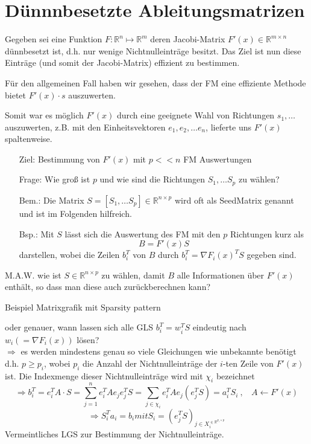 \section{Dünnnbesetzte Ableitungsmatrizen}
\label{chap:sparsemats}

Gegeben sei eine Funktion $F:\mathbb{R}^n\mapsto\mathbb{R}^m$ deren Jacobi-Matrix $F'(x) \in \mathbb{R}^{m\times n}$ dünnbesetzt ist, d.h. nur wenige Nichtnulleinträge besitzt. Das Ziel ist nun diese Einträge (und somit der Jacobi-Matrix) effizient zu bestimmen.

\noindent
Für den allgemeinen Fall haben wir gesehen, dass der FM eine effiziente Methode bietet $F'(x)\cdot s$ auszuwerten.

Somit war es möglich $F'(x)$ durch eine geeignete Wahl von Richtungen  $s_1,\dots$ auszuwerten, z.B. mit den Einheitsvektoren $e_1,e_2, \dots e_n$, lieferte uns $F'(x)$ spaltenweise.\\


\begin{itemize}
	\item[Ziel:] Bestimmung von $F'(x)$ mit $p <<n$ FM Auswertungen
	\item[Frage:]Wie groß ist $p$ und wie sind die Richtungen $S_1,\dots S_p$ zu wählen?
	\item[Bem.:] Die Matrix $S = [S_1, \dots S_p] \in \mathbb{R}^{n\times p}$ wird oft als \glqq Seed\grqq Matrix genannt und ist im Folgenden hilfreich.
	\item[Bsp.:]
	Mit $S$ lässt sich die Auswertung des FM mit den $p$ Richtungen kurz als 
	$$B = F'(x)S$$
	darstellen, wobei die Zeilen $b_i^T$ von $B$ durch $b_i^T = \nabla F_i(x)^TS$ gegeben sind.
\end{itemize}

\noindent
M.A.W. wie ist $S\in\mathbb{R}^{n\times p}$ zu wählen, damit $B$ alle Informationen über $F'(x)$ enthält, so dass man diese auch zurückberechnen kann?

Beispiel Matrixgrafik mit Sparsity pattern\\
\vspace{3cm}

oder genauer, wann lassen sich alle GLS $b_i^T = w_i^TS$ eindeutig nach $w_i (=\nabla F_i(x))$ lösen?\\
$\Rightarrow$ es werden mindestens genau so viele Gleichungen wie unbekannte benötigt\\

\noindent
d.h. $p \geq p_i$, wobei $p_i$ die Anzahl der Nichtnulleinträge der $i$-ten Zeile von $F'(x)$ ist. Die Indexmenge dieser Nichtnulleinträge wird mit $\chi_i$ bezeichnet
$$\Rightarrow b_i^T = e_i^T A \cdot S = \sum_{j=1}^n e_i^T A e_j e_j^T S =\sum_{j\in \chi_i} e_i^T A e_j (e_j^T S) = a_i^T S_i \ ,\ \ \ \ A \leftarrow F'(x)$$
$$\Rightarrow S_i^Ta_i = b_i mit S_i = (e_j^TS)_{j\in X_i^{\in \mathbb{R}^{p_i\times p}}}$$
Vermeintliches LGS zur Bestimmung der Nichtnulleinträge.


